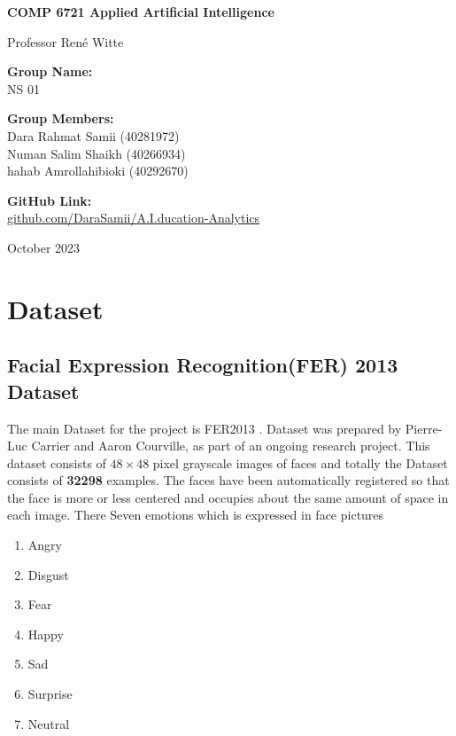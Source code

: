 \documentclass[]{report}
\begin{document}
\begin{titlepage}
	\begin{center}
		\vspace*{1cm}

		
		
		\vspace*{2cm}
		
		\textbf{\Large COMP 6721 Applied Artificial Intelligence}
		
		\vspace{0.5cm}
		Professor René Witte
		
		\vspace{1.5cm}
		\textbf{Group Name:}\\
		NS 01
		\vspace{1.5cm}
		
		\textbf{Group Members:}\\
		Dara Rahmat Samii (40281972)\\ Numan Salim Shaikh (40266934) \\ hahab Amrollahibioki (40292670)
		
		
		\vfill
		
		\textbf{GitHub Link:}\\
		\href{https://github.com/DaraSamii/A.I.ducation-Analytics}{github.com/DaraSamii/A.I.ducation-Analytics}
		
		\vfill

		
		October 2023
		
	\end{center}
\end{titlepage}
\newpage
\chapter{Dataset}
\section{Facial Expression Recognition(FER) 2013 Dataset}
The main Dataset for the project is FER2013 \cite{FER2013}. Dataset was prepared by Pierre-Luc Carrier and Aaron Courville, as part of an ongoing research project. This dataset consists of $48 \times 48$ pixel grayscale images of faces and totally the Dataset consists of \textbf{32298} examples. The faces have been automatically registered so that the face is more or less centered and occupies about the same amount of space in each image. There Seven emotions which is expressed in face pictures

\begin{enumerate}
	\item Angry
	\item Disgust
	\item Fear
	\item Happy
	\item Sad
	\item Surprise
	\item Neutral
\end{enumerate}
\end{document}
